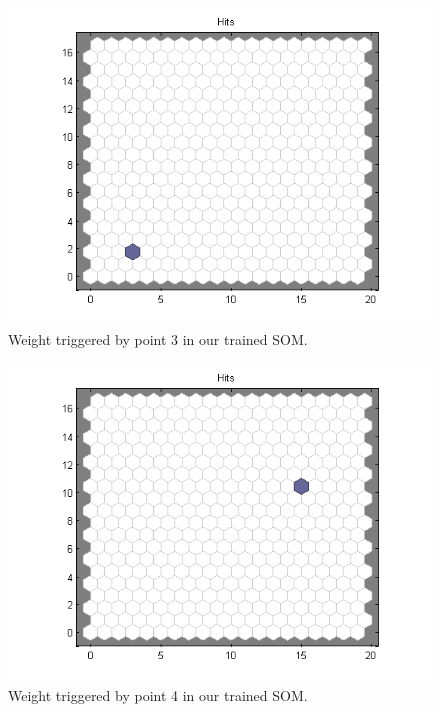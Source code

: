 \documentclass[a4paper]{article}
\begin{document}
 \begin{figure}[H] %
	 \includegraphics[scale=0.5]{point3.png}
	 \caption{\label{fig:point3} Weight triggered by point 3 in our trained SOM.}
 \end{figure}
 \begin{figure}[H] %
	 \includegraphics[scale=0.5]{point4.png}
	 \caption{\label{fig:point4} Weight triggered by point 4 in our trained SOM.}
 \end{figure}
\end{document}
